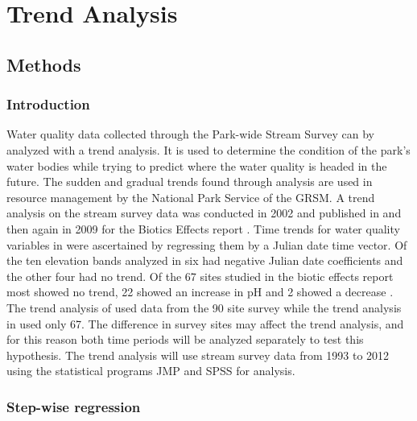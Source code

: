\chapter{Trend Analysis}\label{ch:TA}

\section{Methods}

\subsection{Introduction}

Water quality data collected through the Park-wide Stream Survey can by analyzed with a trend analysis.
It is used to determine the condition of the park's water bodies while trying to predict where the water quality is headed in the future. 
The sudden and gradual trends found through analysis are used in resource management by the National Park Service of the GRSM.
A trend analysis on the stream survey data was conducted in 2002 and published in \citet{robinson2008ph} and then again in 2009 for the Biotics Effects report \citep{cai2013}.
Time trends for water quality variables  in \citet{robinson2008ph} were ascertained by regressing them by a Julian date time vector.
Of the ten elevation bands analyzed in \citet{robinson2008ph} six had negative Julian date coefficients and the other four had no trend. 
Of the 67 sites studied in the biotic effects report most showed no trend, 22 showed an increase in pH and 2 showed a decrease \citep{cai2013}. 
The trend analysis of \citet{robinson2008ph} used data from the 90 site survey while the trend analysis in \citet{cai2013} used only 67.
The difference in survey sites may affect the trend analysis, and for this reason both time periods will be analyzed separately to test this hypothesis.
The trend analysis will use stream survey data from 1993 to 2012 using the statistical programs JMP and SPSS for analysis.

\subsection{Step-wise regression}\label{sec:swregression}

